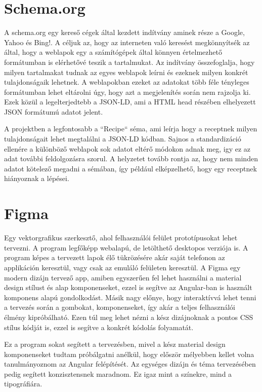 \documentclass[12pt]{report}
\theoremstyle{definition}
\begin{document}
\section{Schema.org}
\label{shemaorg}

A schema.org egy kereső cégek által kezdett indítvány aminek része a Google, Yahoo és Bing!. 
A céljuk az, hogy az interneten való keresést megkönnyítsék az által, hogy a weblapok egy a számítógépek által könnyen értelmezhető formátumban is elérhetővé teszik a tartalmukat. 
Az indítvány összefoglalja, hogy milyen tartalmakat tudnak az egyes weblapok leírni és ezeknek milyen konkrét tulajdonságaik lehetnek. 
A weblapokban ezeket az adatokat több féle tényleges formátumban lehet eltárolni úgy, hogy azt a megjelenítés során nem rajzolja ki. Ezek közül a legelterjedtebb a JSON-LD, ami a HTML head részében elhelyezett JSON formátumú adatot jelent.

A projektben a legfontosabb a “Recipe“ séma, ami leírja hogy a receptnek milyen tulajdonságait lehet megtalálni a JSON-LD kódban. 
Sajnos a standardizáció ellenére a különböző weblapok sok adatot eltérő módokon adnak meg, igy ez az adat további feldolgozásra szorul. 
A helyzetet tovább rontja az, hogy nem minden adatot kötelező megadni a sémában, így például elképzelhető, hogy egy receptnek hiányoznak a lépései. 


\section{Figma}
Egy  vektorgrafikus szerkesztő, ahol felhasználói felület prototípusokat lehet tervezni. A program legfőképp webalapú, de letölthető desktopos verziója is. 
A program képes a tervezett lapok élő tükrözésére akár saját telefonon az applikáción keresztül, vagy csak az emuláló felületen keresztül. 
A Figma egy modern dizájn tervező app, amiben egyszerűen fel lehet használni a material design stílust és alap komponenseket, ezzel is segítve az Angular-ban is használt komponens alapú gondolkodást. Másik nagy előnye, hogy interaktívvá lehet tenni a tervezés során a gombokat, komponenseket, így akár a teljes felhasználói élmény kipróbálható. Ezen túl meg lehet nézni a kész dizájnoknak  a pontos CSS stílus kódját is, ezzel is segítve a konkrét kódolás folyamatát.

Ez a program sokat segített a tervezésben, mivel a kész material design komponenseket tudtam próbálgatni anélkül, hogy először mélyebben kellet volna tanulmányoznom az Angular felépítését. 
Az egységes dizájn és téma tervezésében pedig segített konzisztensnek maradnom. Ez igaz mint a színekre, mind a tipográfiára.
\end{document}
